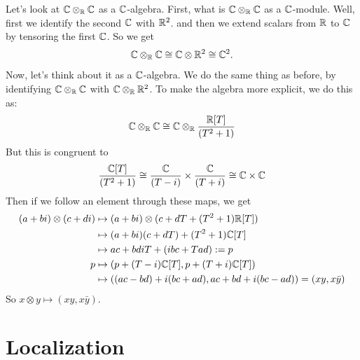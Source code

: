 \documentclass{article}
\begin{document}
\begin{ex}
    Let's look at $\mathbb{C} \otimes_{\mathbb{R}} \mathbb{C}$ as a $\mathbb{C}$-algebra.
    First, what is $\mathbb{C} \otimes_{\mathbb{R}} \mathbb{C}$ as a $\mathbb{C}$-module. Well, first we identify the second $\mathbb{C}$ with $\mathbb{R}^{2}$. and then we extend scalars from $\mathbb{R}$ to $\mathbb{C}$ by tensoring the first $\mathbb{C}$.\gap 
    So we get \[\mathbb{C} \otimes_{\mathbb{R}} \mathbb{C} \cong \mathbb{C} \otimes \mathbb{R}^{2} \cong \mathbb{C}^{2}. \]
    Now, let's think about it as a $\mathbb{C}$-algebra. We do the same thing as before, by identifying $\mathbb{C} \otimes_{\mathbb{R}} \mathbb{C}$ with $\mathbb{C} \otimes_{\mathbb{R}} \mathbb{R}^{2}$. To make the algebra more explicit, we do this as:
    \[ \mathbb{C} \otimes_{\mathbb{R}} \mathbb{C} \cong \mathbb{C} \otimes_{\mathbb{R}} \frac{\mathbb{R}[T]}{(T^{2}+1)}\]
    But this is congruent to \[ \frac{\mathbb{C}[T]}{(T^{2}+1)} \cong \frac{\mathbb{C}}{(T-i)} \times \frac{\mathbb{C}}{(T+i)} \cong \mathbb{C} \times \mathbb{C} \] Then if we follow an element through these maps, we get \begin{align*}
        (a+bi)\otimes(c+di) &\mapsto (a+bi) \otimes (c + dT + (T^{2}+1)\mathbb{R}[T])\\ &\mapsto (a+bi)(c+dT) + (T^{2}+1)\mathbb{C}[T]\\ &\mapsto ac + bdiT + (ibc + Tad) := p\\
        p &\mapsto (p + (T-i)\mathbb{C}[T],p+(T+i)\mathbb{C}[T])\\ &\mapsto ((ac-bd)+i(bc+ad), ac + bd + i(bc-ad)) = (xy,x \bar y)
    \end{align*}
    So $x \otimes y \mapsto (xy, x \bar y)$.
\end{ex}
\section{Localization}
\end{document}
